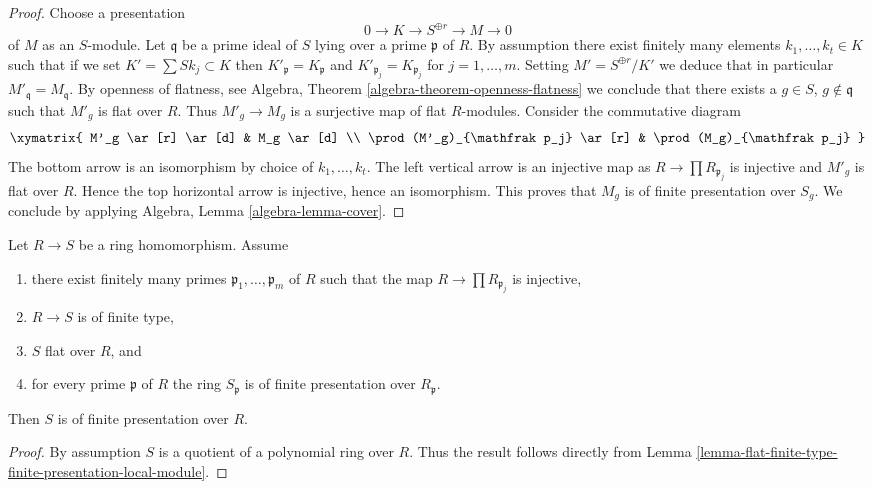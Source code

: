 \begin{proof}
Choose a presentation
$$
0 \to K \to S^{\oplus r} \to M \to 0
$$
of $M$ as an $S$-module. Let $\mathfrak q$ be a prime ideal of $S$
lying over a prime $\mathfrak p$ of $R$. By assumption there exist
finitely many elements $k_1, \ldots, k_t \in K$ such that if we set
$K' = \sum Sk_j \subset K$ then
$K'_{\mathfrak p} = K_{\mathfrak p}$ and
$K'_{\mathfrak p_j} = K_{\mathfrak p_j}$ for $j = 1, \ldots, m$.
Setting $M' = S^{\oplus r}/K'$ we deduce that in particular
$M'_{\mathfrak q} = M_{\mathfrak q}$. By openness of flatness, see
Algebra, Theorem \ref{algebra-theorem-openness-flatness}
we conclude that there exists a $g \in S$, $g \not \in \mathfrak q$
such that $M'_g$ is flat over $R$. Thus $M'_g \to M_g$ is a surjective
map of flat $R$-modules. Consider the commutative diagram
$$
\xymatrix{
M'_g \ar[r] \ar[d] & M_g \ar[d] \\
\prod (M'_g)_{\mathfrak p_j} \ar[r] & \prod (M_g)_{\mathfrak p_j}
}
$$
The bottom arrow is an isomorphism by choice of $k_1, \ldots, k_t$.
The left vertical arrow is an injective map as
$R \to \prod R_{\mathfrak p_j}$ is injective and $M'_g$ is flat over $R$.
Hence the top horizontal arrow is injective, hence an isomorphism.
This proves that $M_g$ is of finite presentation over $S_g$.
We conclude by applying
Algebra, Lemma \ref{algebra-lemma-cover}.
\end{proof}

\begin{lemma}
\label{lemma-flat-finite-type-finite-presentation-local}
Let $R \to S$ be a ring homomorphism.
Assume
\begin{enumerate}
\item there exist finitely many primes
$\mathfrak p_1, \ldots, \mathfrak p_m$ of $R$ such that
the map $R \to \prod R_{\mathfrak p_j}$ is injective,
\item $R \to S$ is of finite type,
\item $S$ flat over $R$, and
\item for every prime $\mathfrak p$ of $R$ the ring $S_{\mathfrak p}$
is of finite presentation over $R_{\mathfrak p}$.
\end{enumerate}
Then $S$ is of finite presentation over $R$.
\end{lemma}

\begin{proof}
By assumption $S$ is a quotient of a polynomial ring over $R$.
Thus the result follows directly from
Lemma \ref{lemma-flat-finite-type-finite-presentation-local-module}.
\end{proof}

